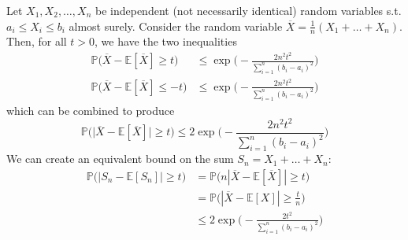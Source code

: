 \documentclass{article}
\begin{document}
      \begin{theorem}
        Let $X_1, X_2, \ldots, X_n$ be independent (not necessarily identical) random variables s.t. $a_i \leq X_i \leq b_i$ almost surely. Consider the random variable $\overline{X} = \frac{1}{n} (X_1 + \ldots + X_n)$. Then, for all $t > 0$, we have the two inequalities
        \begin{align*}
          \mathbb{P}\big( \overline{X} - \mathbb{E}[\overline{X}] \geq t \big) & \leq \exp \bigg( -\frac{2 n^2 t^2}{\sum_{i=1}^n (b_i - a_i)^2} \bigg) \\
          \mathbb{P}\big( \overline{X} - \mathbb{E}[\overline{X}] \leq -t \big) & \leq \exp \bigg( -\frac{2 n^2 t^2}{\sum_{i=1}^n (b_i - a_i)^2} \bigg)
        \end{align*}
        which can be combined to produce 
        \begin{equation}
          \mathbb{P}\big( \big| \overline{X} - \mathbb{E}[\overline{X}] \big| \geq t \big) \leq 2 \exp \bigg( -\frac{2 n^2 t^2}{\sum_{i=1}^n (b_i - a_i)^2} \bigg)
        \end{equation}
        We can create an equivalent bound on the sum $S_n = X_1 + \ldots + X_n$: 
        \begin{align*}
          \mathbb{P}\big(| S_n - \mathbb{E}[S_n] | \geq t\big) & = \mathbb{P}\big( n |\overline{X} - \mathbb{E}[\overline{X}] | \geq t \big) \\
            & = \mathbb{P} \big( |\overline{X} - \mathbb{E}[X] | \geq \frac{t}{n} \big) \\
            & \leq 2 \exp \bigg( -\frac{2 t^2}{\sum_{i=1}^n (b_i - a_i)^2} \bigg) 
        \end{align*}
      \end{theorem}
\end{document}
